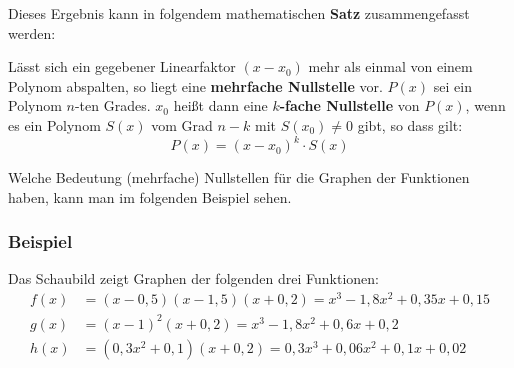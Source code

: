 Dieses Ergebnis kann in folgendem mathematischen \textbf{Satz} zusammengefasst werden:


Lässt sich ein gegebener Linearfaktor $(x - x_0)$ mehr als einmal von einem Polynom abspalten, so liegt eine \textbf{mehrfache Nullstelle} vor. $P(x)$ sei ein Polynom $n$-ten Grades. $x_0$ heißt dann eine \textbf{$k$-fache Nullstelle} von $P(x)$, wenn es ein Polynom $S(x)$ vom Grad $n-k$ mit $S(x_0) \neq 0$ gibt, so dass gilt:
\[ P(x) = (x - x_0)^k \cdot S(x) \]

Welche Bedeutung (mehrfache) Nullstellen für die Graphen der Funktionen haben, kann man im folgenden Beispiel sehen.

\subsubsection{Beispiel}

Das Schaubild zeigt Graphen der folgenden drei Funktionen:
\begin{align*}
  f(x) &= (x - 0{,}5)(x - 1{,}5)(x + 0{,}2) = x^3 - 1{,}8x^2 + 0{,}35x + 0{,}15\\
  g(x) &= (x - 1)^2(x + 0{,}2) = x^3 - 1{,}8x^2 + 0{,}6x + 0{,}2\\
  h(x) &= (0{,}3x^2 + 0{,}1)(x + 0{,}2) = 0{,}3x^3 + 0{,}06x^2 + 0{,}1x + 0{,}02
\end{align*}

\begin{center}
\end{center}

